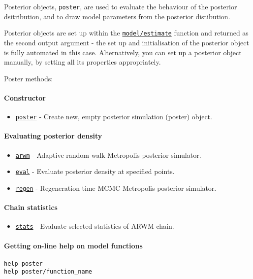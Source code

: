 

	Posterior objects, \texttt{poster}, are used to evaluate the behaviour
of the posterior dsitribution, and to draw model parameters from the
posterior distibution.

Posterior objects are set up within the
\href{model/estimate}{\texttt{model/estimate}} function and returned as
the second output argument - the set up and initialisation of the
posterior object is fully automated in this case. Alternatively, you can
set up a posterior object manually, by setting all its properties
appropriately.

Poster methods:

\paragraph{Constructor}

\begin{itemize}
\itemsep1pt\parskip0pt
\item
  \href{poster/poster}{\texttt{poster}} - Create new, empty posterior
  simulation (poster) object.
\end{itemize}

\paragraph{Evaluating posterior
density}

\begin{itemize}
\itemsep1pt\parskip0pt
\item
  \href{poster/arwm}{\texttt{arwm}} - Adaptive random-walk Metropolis
  posterior simulator.
\item
  \href{poster/eval}{\texttt{eval}} - Evaluate posterior density at
  specified points.
\item
  \href{poster/regen}{\texttt{regen}} - Regeneration time MCMC
  Metropolis posterior simulator.
\end{itemize}

\paragraph{Chain statistics}

\begin{itemize}
\itemsep1pt\parskip0pt
\item
  \href{poster/stats}{\texttt{stats}} - Evaluate selected statistics of
  ARWM chain.
\end{itemize}

\paragraph{Getting on-line help on model
functions}

\begin{verbatim}
help poster
help poster/function_name
\end{verbatim}



